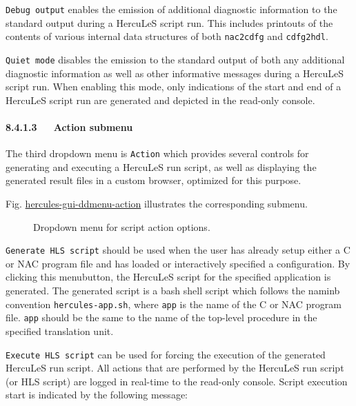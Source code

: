 \documentclass[a4paper]{article}
\begin{document}
\texttt{Debug output} enables the emission of additional diagnostic information to the standard output during a HercuLeS script run. This includes printouts of the contents of various internal data structures of both \texttt{nac2cdfg} and \texttt{cdfg2hdl}.

\texttt{Quiet mode} disables the emission to the standard output of both any additional diagnostic information as well as other informative messages during a HercuLeS script run. When enabling this mode, only indications of the start and end of a HercuLeS script run are generated and depicted in the read-only console.


\paragraph{8.4.1.3~~~Action submenu%
  \label{action-submenu}%
}

The third dropdown menu is \texttt{Action} which provides several controls for generating and executing a HercuLeS run script, as well as displaying the generated result files in a custom browser, optimized for this purpose.

Fig. \hyperref[hercules-gui-ddmenu-action]{hercules-gui-ddmenu-action} illustrates the corresponding submenu.
\begin{figure}
\label{hercules-gui-ddmenu-action}
\noindent{}
\caption{Dropdown menu for script action options.}
\end{figure}

\texttt{Generate HLS script} should be used when the user has already setup either a C or NAC program file and has loaded or interactively specified a configuration. By clicking this menubutton, the HercuLeS script for the specified application is generated. The generated script is a bash shell script which follows the naminb convention \texttt{hercules-app.sh}, where \texttt{app} is the name of the C or NAC program file. \texttt{app} should be the same to the name of the top-level procedure in the specified translation unit.

\texttt{Execute HLS script} can be used for forcing the execution of the generated HercuLeS run script. All actions that are performed by the HercuLeS run script (or HLS script) are logged in real-time to the read-only console. Script execution start is indicated by the following message:
\end{document}
